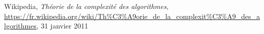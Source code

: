 \begin{thebibliography}{9}

    Wikipedia,
    \emph{Théorie de la complexité des algorithmes},
    \url{https://fr.wikipedia.org/wiki/Th\%C3\%A9orie_de_la_complexit\%C3\%A9_des_algorithmes},
    31 janvier 2011

\end{thebibliography}
